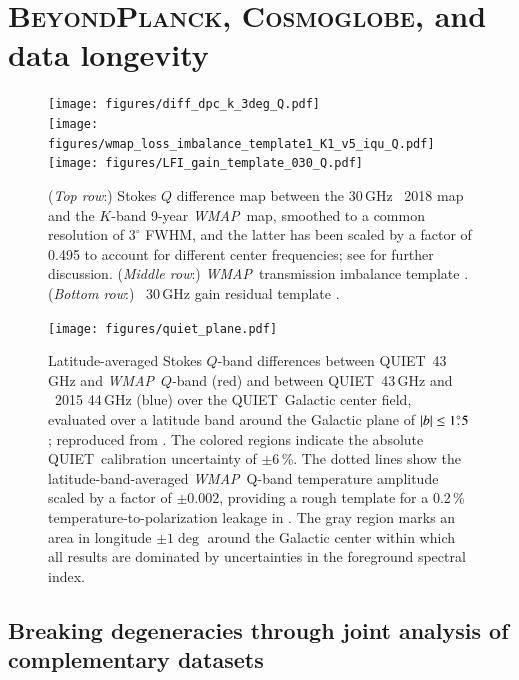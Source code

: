 \documentclass[twocolumn]{openjournal}
\def\WMAP{\textit{WMAP}}
\newcommand{\BP}{\textsc{BeyondPlanck}}
\newcommand{\cosmoglobe}{\textsc{Cosmoglobe}}
\begin{document}
\section{\BP, \cosmoglobe, and data longevity}
\label{sec:bp}

\begin{figure}[t]
    \center
    \texttt{[image: figures/diff\_dpc\_k\_3deg\_Q.pdf]}\\
    \texttt{[image: figures/wmap\_loss\_imbalance\_template1\_K1\_v5\_iqu\_Q.pdf]}\\
    \texttt{[image: figures/LFI\_gain\_template\_030\_Q.pdf]}
    \caption{(\emph{Top row}:) Stokes $Q$ difference map between the 30\,GHz \Planck\ 2018 map and the $K$-band 9-year \WMAP\ map, smoothed to a common resolution of $3^{\circ}$ FWHM, and the latter has been scaled by a factor of 0.495 to account for different center frequencies; see \citet{bp07} for further discussion. (\emph{Middle row}:) \WMAP\ transmission imbalance template \citep{jarosik2007}. (\emph{Bottom row}:) \Planck\ 30\,GHz gain residual template \citep{planck2016-l02}.}
    \label{fig:diff_30_k}
\end{figure}

\begin{figure}[t]
    \center
    \texttt{[image: figures/quiet\_plane.pdf]}
    \caption{Latitude-averaged Stokes $Q$-band differences between
      QUIET\ 43\,GHz and \WMAP\ $Q$-band (red) and between
      QUIET\ 43\,GHz and \Planck\ 2015 44\,GHz (blue) over the
      QUIET\ Galactic center field, evaluated over a latitude band
      around the Galactic plane of $|b| \leq 1\pdeg5$; reproduced from
      \citet{ruud:2015}. The colored regions indicate the absolute
      QUIET\ calibration uncertainty of $\pm$6$\,$\%. The dotted
      lines show the latitude-band-averaged \WMAP\ Q-band temperature
      amplitude scaled by a factor of $\pm 0.002$, providing a rough
      template for a 0.2\,\% temperature-to-polarization leakage in \Planck. The
      gray region marks an area in longitude $\pm 1\deg$ around the
      Galactic center within which all results are dominated by
      uncertainties in the foreground spectral index.}
    \label{fig:quiet}
\end{figure}

\subsection{Breaking degeneracies through joint analysis of complementary datasets}
\end{document}
